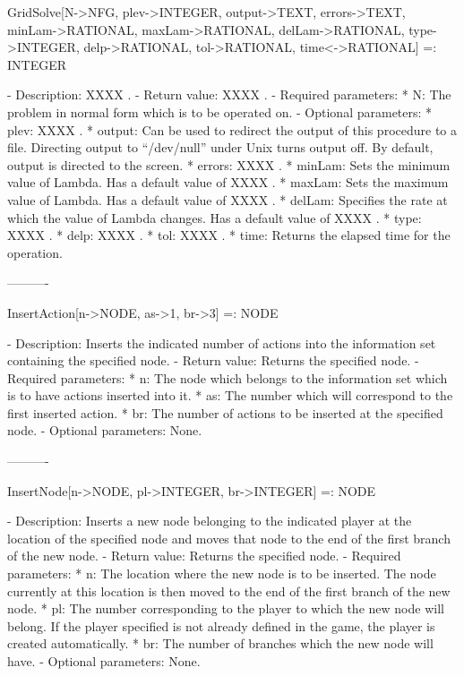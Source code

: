 GridSolve[N->NFG, {plev->INTEGER}, {output->TEXT}, {errors->TEXT},
	{minLam->RATIONAL}, {maxLam->RATIONAL}, {delLam->RATIONAL}, 
	{type->INTEGER}, {delp->RATIONAL}, {tol->RATIONAL}, {time<->RATIONAL}]
	 =: INTEGER

   -	Description:  XXXX .
   -	Return value:  XXXX .
   -	Required parameters:
	  *  N:  The problem in normal form which is to be operated on.
   -	Optional parameters:
	  *  plev:  XXXX .
	  *  output:  Can be used to redirect the output of this procedure to a
		file.  Directing output to ``/dev/null'' under Unix turns 
		output off.  By default, output is directed to the screen.
	  *  errors:  XXXX .
	  *  minLam:  Sets the minimum value of Lambda.  Has a default value of
		XXXX .
	  *  maxLam:  Sets the maximum value of Lambda.  Has a default value of
		XXXX .
	  *  delLam:  Specifies the rate at which the value of Lambda changes.
		Has a default value of XXXX .
	  *  type:  XXXX .
	  *  delp:  XXXX .
	  *  tol:  XXXX .
	  *  time:  Returns the elapsed time for the operation.

----------

InsertAction[n->NODE, as->1, br->3] =: NODE

   -	Description:  Inserts the indicated number of actions into the 
	information set containing the specified node.
   -	Return value:  Returns the specified node.
   -	Required parameters:
	  *  n:  The node which belongs to the information set which is to have
		actions inserted into it.
	  *  as:  The number which will correspond to the first inserted
		action.
	  *  br:  The number of actions to be inserted at the specified node.
   -	Optional parameters:  None.

----------

InsertNode[n->NODE, pl->INTEGER, br->INTEGER] =: NODE

   -	Description:  Inserts a new node belonging to the indicated player at 
	the location of the specified node and moves that node to the end of 
	the first branch of the new node.
   -	Return value:  Returns the specified node.
   -	Required parameters:
	  *  n:  The location where the new node is to be inserted.  The node
		currently at this location is then moved to the end of the 
		first branch of the new node.
	  *  pl:  The number corresponding to the player to which the new node
		will belong.  If the player specified is not already defined in
		the game, the player is created automatically.
	  *  br:  The number of branches which the new node will have.
   -	Optional parameters:  None.

